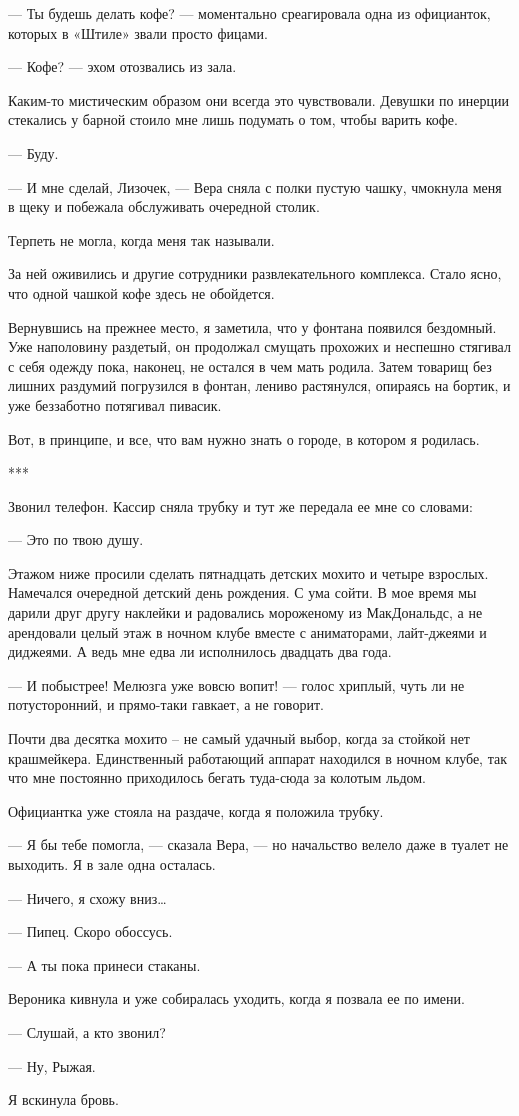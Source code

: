 \documentclass[
]{book}
\begin{document}
--- Ты будешь делать кофе? --- моментально среагировала одна из официанток, которых в «Штиле» звали просто фицами.

--- Кофе? --- эхом отозвались из зала.

Каким-то мистическим образом они всегда это чувствовали. Девушки по инерции стекались у барной стоило мне лишь подумать о том, чтобы варить кофе.

--- Буду.

--- И мне сделай, Лизочек, --- Вера сняла с полки пустую чашку, чмокнула меня в щеку и побежала обслуживать очередной столик.

Терпеть не могла, когда меня так называли.

За ней оживились и другие сотрудники развлекательного комплекса. Стало ясно, что одной чашкой кофе здесь не обойдется.

Вернувшись на прежнее место, я заметила, что у фонтана появился бездомный. Уже наполовину раздетый, он продолжал смущать прохожих и неспешно стягивал с себя одежду пока, наконец, не остался в чем мать родила. Затем товарищ без лишних раздумий погрузился в фонтан, лениво растянулся, опираясь на бортик, и уже беззаботно потягивал пивасик.

Вот, в принципе, и все, что вам нужно знать о городе, в котором я родилась.

***

Звонил телефон. Кассир сняла трубку и тут же передала ее мне со словами:

--- Это по твою душу.

Этажом ниже просили сделать пятнадцать детских мохито и четыре взрослых. Намечался очередной детский день рождения. С ума сойти. В мое время мы дарили друг другу наклейки и радовались мороженому из МакДональдс, а не арендовали целый этаж в ночном клубе вместе с аниматорами, лайт-джеями и диджеями. А ведь мне едва ли исполнилось двадцать два года.

--- И побыстрее! Мелюзга уже вовсю вопит! --- голос хриплый, чуть ли не потусторонний, и прямо-таки гавкает, а не говорит.

Почти два десятка мохито -- не самый удачный выбор, когда за стойкой нет крашмейкера. Единственный работающий аппарат находился в ночном клубе, так что мне постоянно приходилось бегать туда-сюда за колотым льдом.

Официантка уже стояла на раздаче, когда я положила трубку.

--- Я бы тебе помогла, --- сказала Вера, --- но начальство велело даже в туалет не выходить. Я в зале одна осталась.

--- Ничего, я схожу вниз\ldots{}

--- Пипец. Скоро обоссусь.

--- А ты пока принеси стаканы.

Вероника кивнула и уже собиралась уходить, когда я позвала ее по имени.

--- Слушай, а кто звонил?

--- Ну, Рыжая.

Я вскинула бровь.
\end{document}
